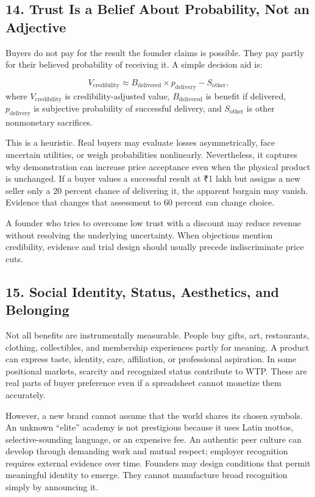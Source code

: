 \subsection*{14. Trust Is a Belief About Probability, Not an Adjective}

Buyers do not pay for the result the founder claims is possible. They pay partly for their believed probability of receiving it. A simple decision aid is:

\begin{equation}
V_{\text{credibility}} \approx B_{\text{delivered}} \times p_{\text{delivery}} - S_{\text{other}},
\end{equation}
where $V_{\text{credibility}}$ is credibility-adjusted value, $B_{\text{delivered}}$ is benefit if delivered, $p_{\text{delivery}}$ is subjective probability of successful delivery, and $S_{\text{other}}$ is other nonmonetary sacrifices.

This is a heuristic. Real buyers may evaluate losses asymmetrically, face uncertain utilities, or weigh probabilities nonlinearly. Nevertheless, it captures why demonstration can increase price acceptance even when the physical product is unchanged. If a buyer values a successful result at ₹1 lakh but assigns a new seller only a 20 percent chance of delivering it, the apparent bargain may vanish. Evidence that changes that assessment to 60 percent can change choice.

A founder who tries to overcome low trust with a discount may reduce revenue without resolving the underlying uncertainty. When objections mention credibility, evidence and trial design should usually precede indiscriminate price cuts.

\subsection*{15. Social Identity, Status, Aesthetics, and Belonging}

Not all benefits are instrumentally measurable. People buy gifts, art, restaurants, clothing, collectibles, and membership experiences partly for meaning. A product can express taste, identity, care, affiliation, or professional aspiration. In some positional markets, scarcity and recognized status contribute to WTP. These are real parts of buyer preference even if a spreadsheet cannot monetize them accurately.

However, a new brand cannot assume that the world shares its chosen symbols. An unknown ``elite'' academy is not prestigious because it uses Latin mottos, selective-sounding language, or an expensive fee. An authentic peer culture can develop through demanding work and mutual respect; employer recognition requires external evidence over time. Founders may design conditions that permit meaningful identity to emerge. They cannot manufacture broad recognition simply by announcing it.

